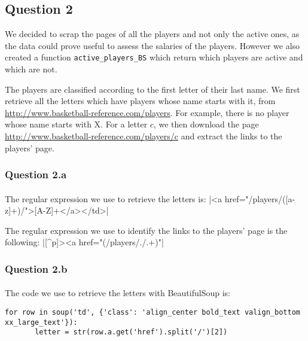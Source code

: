 
\subsection{Question 2}
\label{subsec:312}
We decided to scrap the pages of all the players and not only the active ones, as the data could prove useful to assess the salaries of the players. However we also created a function \verb|active_players_BS| which return which players are active and which are not.

The players are classified according to the first letter of their last name. We first retrieve all the letters which have players whose name starts with it, from \url{http://www.basketball-reference.com/players}. For example, there is no player whose name starts with X. For a letter $c$, we then download the page \url{http://www.basketball-reference.com/players/c} and extract the links to the players' page.

\subsubsection{Question 2.a}
\label{subsubsec:312a}
\paragraph{} The regular expression we use to retrieve the letters is: |<a href="/players/([a-z]+)/">[A-Z]+</a></td>|

The regular expression we use to identify the links to the players' page is the following:
|[^p]><a href="(/players/./.+)"|


\subsubsection{Question 2.b}
\label{subsubsec:312b}
\paragraph{}  The code we use to retrieve the letters with BeautifulSoup is:
\begin{verbatim}
for row in soup('td', {'class': 'align_center bold_text valign_bottom xx_large_text'}):
       letter = str(row.a.get('href').split('/')[2])
\end{verbatim}

